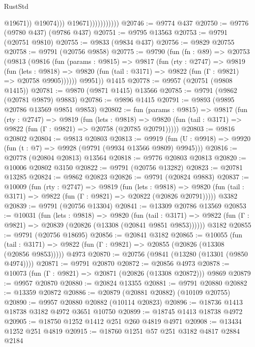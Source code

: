 \begin{lexlean}{RustStd}
\begin{coremodule}
                                    @19671))
                                @19074)))
                          @19671)))))))))))
@20746 := @9774 @437
@20750 := @9776 (@9780 @437) (@9786 @437)
@20751 := @9795 @13563
@20753 := @9791 (@20751 @9810)
@20755 := @9833 (@9834 @437)
@20756 := @9829 @20755
@20758 := @9791 (@20756 @9858)
@20775 := @9790
    (fun (fn : @89) =>
    @20753
      (@9813
        (@9816
          (fun (params : @9815) =>
          @9817
            (fun (rty : @2747) =>
            @9819
              (fun (lets : @9818) =>
              @9820 (fun (tail : @3171) => @9822 (fun (Γ : @9821) => @20758 @9905))))))
        @9951))
    @1415
@20778 := @9957 (@20751 (@9808 @1415))
@20781 := @9870 (@9871 @1415) @13566
@20785 := @9791 (@9862 (@20781 @9879) @9883)
@20786 := @9896 @1415
@20791 := @9893 (@9895 @20786 @13569 @9851 @9853)
@20802 := fun (params : @9815) =>
  @9817
    (fun (rty : @2747) =>
    @9819
      (fun (lets : @9818) =>
      @9820 (fun (tail : @3171) => @9822 (fun (Γ : @9821) => @20758 (@20785 @20791)))))
@20803 := @9816 @20802
@20804 := @9813 @20803
@20813 := @9919
    (fun (U : @9918) => @9920 (fun (t : @7) => @9928 (@9791 (@9934 @13566 @9809) @9945)))
@20816 := @20778 (@20804 @20813) @13564
@20818 := @9776 @20803 @20813
@20820 := @10006 @20802 @3150
@20822 := @9791 (@20756 @13282)
@20823 := @20781 @13285
@20824 := @9862 @20823
@20826 := @9791 (@20824 @9883)
@20837 := @10009
    (fun (rty : @2747) =>
    @9819
      (fun (lets : @9818) =>
      @9820 (fun (tail : @3171) => @9822 (fun (Γ : @9821) => @20822 (@20826 @20791)))))
    @3382
@20839 := @9791 (@20756 @13304)
@20841 := @13309 @20786 @13569
@20853 := @10031
    (fun (lets : @9818) =>
    @9820
      (fun (tail : @3171) =>
      @9822 (fun (Γ : @9821) => @20839 (@20826 (@13308 (@20841 @9851 @9853))))))
    @3182
@20855 := @9791 (@20756 @18695)
@20856 := @20841 @3182
@20865 := @10055
    (fun (tail : @3171) => @9822 (fun (Γ : @9821) => @20855 (@20826 (@13308 (@20856 @9853)))))
    @4973
@20870 := @20756 (@9841 (@13280 (@13301 (@9850 @4974))))
@20871 := @9791 @20870
@20872 := @20856 @4973
@20878 := @10073 (fun (Γ : @9821) => @20871 (@20826 (@13308 @20872))) @9869
@20879 := @9957 @20870
@20880 := @20824 @13355
@20881 := @9791 @20880
@20882 := @13359 @20872
@20886 := @20879 (@20881 @20882) (@10109 @20755)
@20890 := @9957 @20880 @20882 (@10114 @20823)
@20896 := @18736 @1413 @18738 @3182 @4972 @3651 @10750
@20899 := @18745 @1413 @18738 @4972
@20905 := @18750 @1252 @1412 @251 @260 @4819 @4971
@20908 := @13434 @1252 @251 @4819
@20915 := @18760 @1251 @57 @251 @3182 @4817 @2884 @2184

\end{coremodule}
\end{lexlean}
